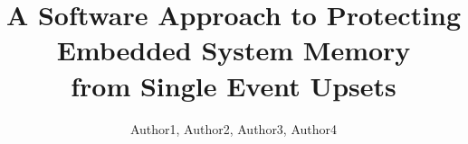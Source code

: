 \documentclass{acm_proc_article-sp}
\begin{document}
\date{}

\title{\Large \bf A Software Approach to Protecting Embedded System Memory\\ from Single Event Upsets}

%
%
%
%
%


%
\author{
%
%
 \alignauthor Author1, Author2, Author3, Author4\\
    \\
}
\end{document}
